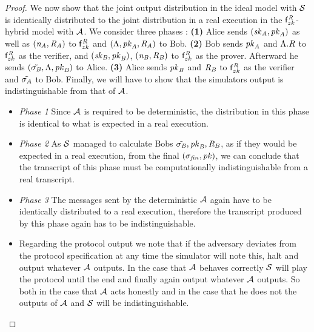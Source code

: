 \begin{proof}
    We now show that the joint output distribution in the ideal model with $\mathcal{S}$ is identically distributed to the joint distribution in a real execution in the $\mathsf{f}^{\mathit{R}}_{zk}$-hybrid model with $\mathcal{A}$.
    We consider three phases :
    \textbf{(1)} Alice sends $(\mathit{sk}_{\mathit{A}}, \mathit{pk}_{\mathit{A}})$ as well as $(\mathit{\mathit{n}_{\mathit{A}}}, \mathit{R}_{\mathit{A}})$ to $\mathsf{f}^{\mathit{R}}_{zk}$ and $(\Lambda, \mathit{pk}_{\mathit{A}}, \mathit{R}_{\mathit{A}})$ to Bob.
    \textbf{(2)} Bob sends $\mathit{pk}_{\mathit{A}}$ and $\Lambda.\mathit{R}$ to $\mathsf{f}^{\mathit{R}}_{zk}$ as the verifier, and  $(\mathit{sk}_{\mathit{B}}, \mathit{pk}_{\mathit{B}})$, $(\mathit{\mathit{n}_{\mathit{B}}}, \mathit{R}_{\mathit{B}})$ to $\mathsf{f}^{\mathit{R}}_{zk}$ as the prover.
    Afterward he sends $(\tilde{\sigma_{\mathit{B}}}, \Lambda, \mathit{pk}_{\mathit{B}})$ to Alice.
    \textbf{(3)} Alice sends $\mathit{pk}_{\mathit{B}}$ and $\mathit{R}_{\mathit{B}}$ to $\mathsf{f}^{\mathit{R}}_{zk}$ as the verifier and $\tilde{\sigma_{\mathit{A}}}$ to Bob.
    Finally, we will have to show that the simulators output is indistinguishable from that of $\mathcal{A}$.

    \begin{itemize}
        \item \textit{Phase 1} Since $\mathcal{A}$ is required to be deterministic, the distribution in this phase is identical to what is expected in a real execution.
        \item \textit{Phase 2} As $\mathcal{S}$ managed to calculate Bobs $\tilde{\sigma_{\mathit{B}}}, \mathit{pk}_{\mathit{B}}, \mathit{R}_{\mathit{B}}$, as if they would be expected in a real execution, from the final $(\sigma_{\mathit{fin}}, \mathit{pk})$, we can conclude that the transcript of this phase must be computationally indistinguishable from a real transcript.
        \item \textit{Phase 3} The messages sent by the deterministic $\mathcal{A}$ again have to be identically distributed to a real execution, therefore the transcript produced by this phase again has to be indistinguishable.
        \item Regarding the protocol output we note that if the adversary deviates from the protocol specification at any time the simulator will note this, halt and output whatever $\mathcal{A}$ outputs.
        In the case that $\mathcal{A}$ behaves correctly $\mathcal{S}$ will play the protocol until the end and finally again output whatever $\mathcal{A}$ outputs.
        So both in the case that $\mathcal{A}$ acts honestly and in the case that he does not the outputs of $\mathcal{A}$ and $\mathcal{S}$ will be indistinguishable.
    \end{itemize}


\end{proof}
